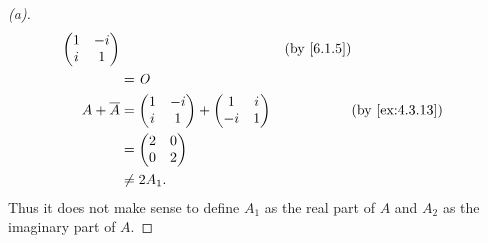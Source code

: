 \begin{proof}[(a)]
\begin{align*}
{\begin{pmatrix}
                                                          1 & -i \\
                                                          i & 1
                                                        \end{pmatrix}} &  & \by{6.1.5} \\
                 & = \zm                                                             \\
    A + \conj{A} & = \begin{pmatrix}
                       1 & -i \\
                       i & 1
                     \end{pmatrix} + \begin{pmatrix}
                                       1  & i \\
                                       -i & 1
                                     \end{pmatrix}    &  & \by{ex:4.3.13}            \\
                 & = \begin{pmatrix}
                       2 & 0 \\
                       0 & 2
                     \end{pmatrix}                                                  \\
                 & \neq 2 A_1.
  \end{align*}
  Thus it does not make sense to define \(A_1\) as the real part of \(A\) and \(A_2\) as the imaginary part of \(A\).
\end{proof}

